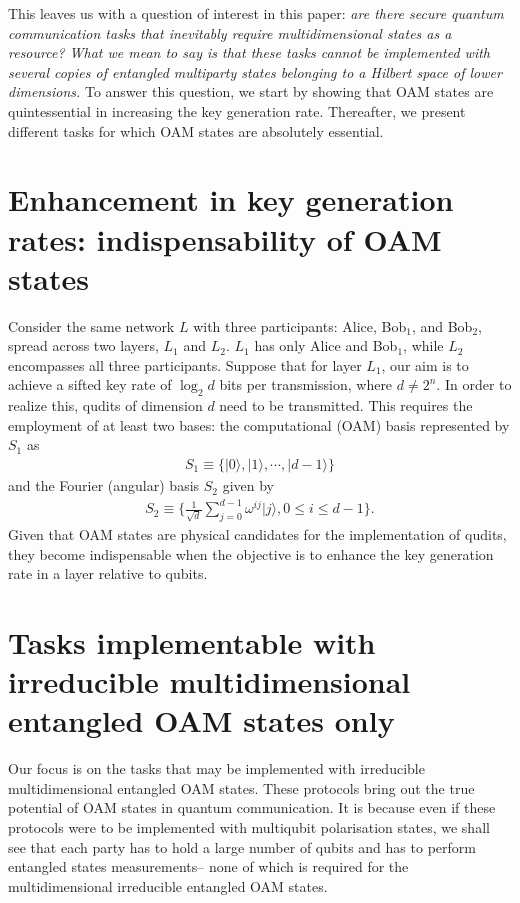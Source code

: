 \documentclass[fleqn,10pt]{wlscirep}
\begin{document}
This leaves us with a question of interest in this paper: {\it are there secure quantum communication tasks that inevitably require multidimensional states as a resource? What we mean to say is that these tasks cannot be implemented with several copies of entangled multiparty states belonging to a Hilbert space of lower dimensions.} To answer this question, we start by showing that OAM states are quintessential in increasing the key generation rate. Thereafter, we present different tasks  for which OAM states are absolutely essential.
\section*{Enhancement in key generation rates: indispensability of OAM states}
Consider the same network \( L \) with three participants: Alice, Bob$_1$, and Bob$_2$, spread across two layers, $L_1$ and $L_2$. $L_1$ has only Alice and Bob$_1$, while $L_2$ encompasses all three participants. Suppose that for layer \( L_1 \), our aim is to achieve a sifted key rate of \( \log_2d \) bits per transmission, where \( d \neq 2^n\). In order to realize this, qudits of dimension \( d \) need to be transmitted. This requires the employment of at least two bases: the computational (OAM) basis represented by \( S_1 \) as
\begin{align}
 S_1 \equiv \{|0\rangle, |1\rangle, \cdots, |d-1\rangle\} 
 \end{align}
and the Fourier (angular) basis \( S_2 \) given by 
\begin{align}
S_2\equiv\Big\{\frac{1}{\sqrt{d}}\sum_{j=0}^{d-1}\omega^{ij}|j\rangle, 0\leq i\leq d-1\Big\}.
\end{align}
Given that OAM states are physical candidates for the implementation of  qudits, they become indispensable when the objective is to enhance the key generation rate in a layer relative to qubits.

\section*{Tasks implementable with irreducible multidimensional entangled OAM states only}
\hypertarget{Tasks implementable with irreducible multidimensional entangled OAM states only}{}
Our focus is on the tasks that may be implemented with irreducible multidimensional entangled OAM states. These protocols bring out the true potential of OAM states in quantum communication. It is because even if these protocols were to be implemented with multiqubit polarisation states,  we shall see that each party has to hold a large number  of qubits and has to perform entangled states measurements-- none of which is required for the multidimensional irreducible entangled OAM states. 
\end{document}
